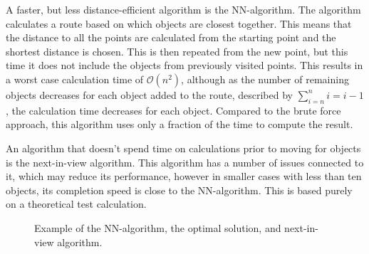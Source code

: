 A faster, but less distance-efficient algorithm is the NN-algorithm. The algorithm calculates a route based on which objects are closest together. This means that the distance to all the points are calculated from the starting point and the shortest distance is chosen. This is then repeated from the new point, but this time it does not include the objects from previously visited points. This results in a worst case calculation time of $\mathcal{O}(n^2)$, although as the number of remaining objects decreases for each object added to the route, described by $\sum\limits_{i=n}^n i = i - 1$, the calculation time decreases for each object. Compared to the brute force approach, this algorithm uses only a fraction of the time to compute the result. 

An algorithm that doesn't spend time on calculations prior to moving for objects is the next-in-view algorithm. This algorithm has a number of issues connected to it, which may reduce its performance, however in smaller cases with less than ten objects, its completion speed is close to the NN-algorithm. This is based purely on a theoretical test calculation.

\begin{figure}[H]
     \caption{\label{fig:algorithm-example} Example of the NN-algorithm, the optimal solution, and next-in-view algorithm.}
\end{figure}

